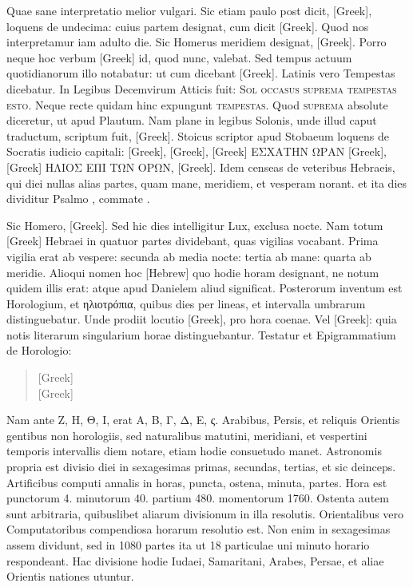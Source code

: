 Quae sane interpretatio melior vulgari.
Sic etiam paulo post dicit,
\textgreek{[Greek]}, loquens de undecima: cuius partem designat,
 cum dicit
\textgreek{[Greek]}.
Quod nos interpretamur iam adulto die.
Sic Homerus
meridiem designat, \textgreek{[Greek]}.
Porro neque
hoc verbum \textgreek{[Greek]} id, quod nunc, valebat.
Sed tempus actuum quotidianorum
illo notabatur: ut cum dicebant \textgreek{[Greek]}.
Latinis
vero Tempestas dicebatur.
In Legibus Decemvirum Atticis fuit:
\textsc{Sol occasus suprema tempestas esto}.
Neque recte
quidam hinc expungunt \textsc{tempestas}.
Quod \textsc{suprema} absolute
diceretur, ut apud Plautum.
Nam plane in legibus Solonis, unde illud
caput traductum, scriptum fuit,
 \textgreek{[Greek]}.
Stoicus
scriptor apud Stobaeum loquens de Socratis iudicio capitali: 
\textgreek{[Greek], [Greek], [Greek]
ΕΣΧΑΤΗΝ ΩΡΑΝ [Greek], [Greek] ΗΛΙΟΣ ΕΠΙ ΤΩΝ
ΟΡΩΝ, [Greek]}.
Idem censeas de veteribus Hebraeis,
qui diei nullas alias partes, quam mane, meridiem, et vesperam norant.
et ita dies dividitur Psalmo , commate .

Sic Homero,
\textgreek{[Greek]}.
Sed hic dies intelligitur Lux, exclusa nocte.
Nam totum \textgreek{[Greek]} Hebraei in quatuor partes
 dividebant, quas vigilias
vocabant.
Prima vigilia erat ab vespere: secunda ab media nocte:
tertia ab mane: quarta ab meridie.
Alioqui nomen hoc \texthebrew{[Hebrew]} quo hodie
horam designant, ne notum quidem illis erat: atque apud Danielem
aliud significat.
Posterorum inventum est Horologium, et \textgreek{ηλιοτρόπια},
quibus dies per lineas, et intervalla umbrarum distinguebatur.
Unde prodiit locutio \textgreek{[Greek]}, pro hora coenae.
Vel \textgreek{[Greek]}:
quia notis literarum singularium horae distinguebantur.
Testatur et Epigrammatium de Horologio:
\begin{verse}
\textgreek{[Greek]}\\
\textgreek{[Greek]}
\end{verse}
Nam ante
\textgreek{Ζ, Η, Θ, Ι,} erat \textgreek{Α, Β, Γ, Δ, Ε, ς.}
Arabibus, Persis, et reliquis Orientis
gentibus non horologiis, sed
naturalibus matutini, meridiani,
et vespertini temporis
intervallis diem notare,
etiam hodie consuetudo manet.
Astronomis propria
est divisio diei in sexagesimas
primas, secundas, tertias,
et sic deinceps.
Artificibus
computi annalis in
horas, puncta, ostena, minuta,
partes.
Hora est punctorum
4. minutorum 40.
partium 480. momentorum
1760.
Ostenta autem sunt arbitraria,
quibuslibet aliarum
divisionum in illa resolutis.
Orientalibus vero Computatoribus
compendiosa horarum
resolutio est.
Non
enim in sexagesimas assem
dividunt, sed in 1080 partes
ita ut 18 particulae uni minuto
horario respondeant.
Hac divisione hodie Iudaei,
Samaritani, Arabes, Persae,
et aliae Orientis nationes utuntur.

